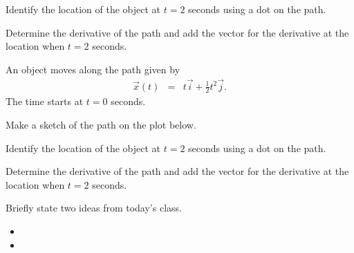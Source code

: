 \begin{problem}
\begin{subproblem}
    \scalebox{0.75}{}

  \item Identify the location of the object at $t=2$ seconds using a
    dot on the path.
  \item Determine the derivative of the path and add the vector for
    the derivative at the location when $t=2$ seconds.
    \vspace{5em}
  \end{subproblem}

  \clearpage

\item An object moves along the path given by
  \begin{eqnarray*}
    \vec{x}(t) & = & t \vec{i} + \frac{1}{2} t^2 \vec{j}.
  \end{eqnarray*}
  The time starts at $t=0$ seconds.

  \begin{subproblem}
  \item Make a sketch of the path on the plot below.

    \scalebox{0.75}{}

  \item Identify the location of the object at $t=2$ seconds using a
    dot on the path.
  \item Determine the derivative of the path and add the vector for
    the derivative at the location when $t=2$ seconds.
    \vspace{5em}
  \end{subproblem}

\end{problem}

\postClass

\begin{problem}
\item Briefly state two ideas from today's class.
  \begin{itemize}
  \item 
  \item 
  \end{itemize}
\item 
  \begin{subproblem}
    \item
  \end{subproblem}
\end{problem}



